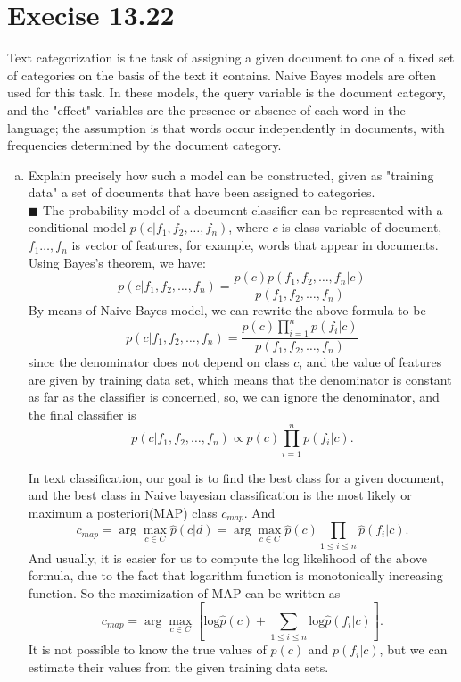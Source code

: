 \documentclass{article}
\newcommand{\solution}[1]{~\\ $\blacksquare$ \sffamily\upshape\selectfont #1
\normalfont ~\\~ }
\begin{document}
\section{Execise 13.22}
Text categorization is the task of assigning a given document to one
of a fixed set of categories on the basis of the text it
contains. Naive Bayes models are often used for this task. In these
models, the query variable is the document category, and the "effect"
variables are the presence or absence of each word in the language;
the assumption is that words occur independently in documents, with
frequencies determined by the document category.
\begin{enumerate}[a.]
\item Explain precisely how such a model can be constructed, given as
  "training data" a set of documents that have been assigned to
  categories.
  \solution{
    The probability model of a document classifier can be represented
    with a conditional model $p(c|f_1,f_2,\ldots,f_n)$, where $c$ is
    class variable of document, $f_1\ldots, f_n$ is vector of features,
    for example, words that appear in documents. \\
    Using Bayes's theorem, we have: \\
    \[ p(c|f_1,f_2,\ldots,f_n) =
    \frac{p(c)p(f_1,f_2,\ldots,f_n|c)}{p(f_1,f_2,\ldots, f_n)} \]
    By means of Naive Bayes model, we can rewrite the above formula to
    be 
    \[ p(c|f_1,f_2,\ldots,f_n) =
    \frac{p(c)\prod_{i=1}^np(f_i|c)}{p(f_1,f_2,\ldots, f_n)} \]
    since the denominator does not depend on class $c$, and the value of
    features are given by training data set, which means that the
    denominator is constant as far as the classifier is concerned,
    so, we can ignore the denominator, and the final classifier is 
    \[ p(c|f_1,f_2,\ldots,f_n) \propto p(c)\prod_{i=1}^np(f_i|c). \]

    In text classification, our goal is to find the best class for a given
    document, and the best class in Naive bayesian classification is
    the most likely or maximum a posteriori(MAP) class $c_{map}$. And 
    \[ c_{map} = \arg\max_{c\in C}\hat{p}(c|d)=\arg\max_{c\in
      C}\hat{p}(c)\prod_{1\leq i \leq n}\hat{p}(f_i|c). \]
    And usually, it is easier for us to compute the log likelihood of
    the above formula, due to the fact that logarithm function is
    monotonically increasing function. So the maximization of MAP can
    be written as 
    \[ c_{map}=\arg\max_{c\in C}[\mbox{log}\hat{p}(c)+\sum_{1\leq i \leq
      n}\mbox{log}\hat{p}(f_i|c)]. \]
    It is not possible to know the true values of $p(c)$ and
    $p(f_i|c)$, but we can estimate their values from the given
    training data sets. 

}
\end{enumerate}
\end{document}
